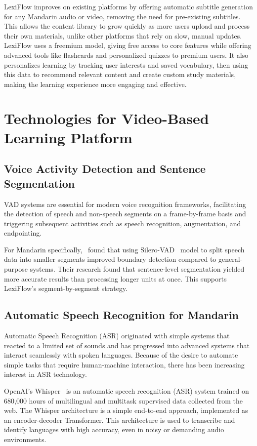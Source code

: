 \documentclass[oneside]{utmthesis}
\begin{document}
LexiFlow improves on existing platforms by offering automatic subtitle generation for any Mandarin audio or video, removing the need for pre-existing subtitles. This allows the content library to grow quickly as more users upload and process their own materials, unlike other platforms that rely on slow, manual updates. LexiFlow uses a freemium model, giving free access to core features while offering advanced tools like flashcards and personalized quizzes to premium users. It also personalizes learning by tracking user interests and saved vocabulary, then using this data to recommend relevant content and create custom study materials, making the learning experience more engaging and effective.


\section{Technologies for Video-Based Learning Platform}
\subsection{Voice Activity Detection and Sentence Segmentation}
VAD systems are essential for modern voice recognition frameworks, facilitating the detection of speech and non-speech segments on a frame-by-frame basis and triggering subsequent activities such as speech recognition, augmentation, and endpointing.~\citep{buddi2023,icassp-2019,chen2020,kumar2024}

For Mandarin specifically,~\citet{pan2025} found that using Silero-VAD~\citep{sileroVAD} model to split speech data into smaller segments improved boundary detection compared to general-purpose systems. Their research found that sentence-level segmentation yielded more accurate results than processing longer units at once. This supports LexiFlow's segment-by-segment strategy.

\subsection{Automatic Speech Recognition for Mandarin}
Automatic Speech Recognition (ASR) originated with simple systems that reacted to a limited set of sounds and has progressed into advanced systems that interact seamlessly with spoken languages. Because of the desire to automate simple tasks that require human-machine interaction, there has been increasing interest in ASR technology.~\citep{juang2005}

OpenAI's Whisper~\citep{radford2023robust} is an automatic speech recognition (ASR) system trained on 680,000 hours of multilingual and multitask supervised data collected from the web.  The Whisper architecture is a simple end-to-end approach, implemented as an encoder-decoder Transformer. This architecture is used to transcribe and identify languages with high accuracy, even in noisy or demanding audio environments.
\end{document}
